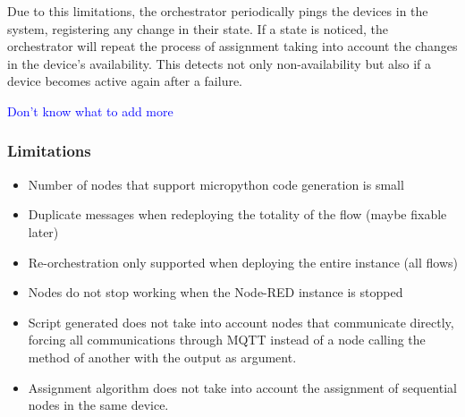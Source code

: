 Due to this limitations, the orchestrator periodically pings the devices in the system, registering any change in their state. If a state is noticed, the orchestrator will repeat the process of assignment taking into account the changes in the device's availability. This detects not only non-availability but also if a device becomes active again after a failure.

\textcolor{blue}{Don't know what to add more}

\subsubsection{Limitations}\label{sec:limitations}

\begin{itemize}
    \item Number of nodes that support micropython code generation is small
    \item Duplicate messages when redeploying the totality of the flow (maybe fixable later)
    \item Re-orchestration only supported when deploying the entire instance (all flows)
    \item Nodes do not stop working when the Node-RED instance is stopped
    \item Script generated does not take into account nodes that communicate directly, forcing all communications through MQTT instead of a node calling the method of another with the output as argument.
    \item Assignment algorithm does not take into account the assignment of sequential nodes in the same device.
\end{itemize}
